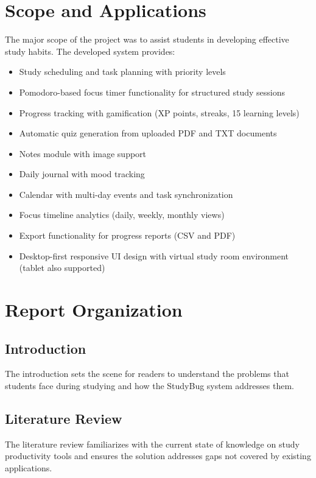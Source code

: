         \section{Scope and Applications}
        The major scope of the project was to assist students in developing effective study habits. The developed system provides:
        \begin{itemize}
            \item Study scheduling and task planning with priority levels
            \item Pomodoro-based focus timer functionality for structured study sessions
            \item Progress tracking with gamification (XP points, streaks, 15 learning levels)
            \item Automatic quiz generation from uploaded PDF and TXT documents
            \item Notes module with image support
            \item Daily journal with mood tracking
            \item Calendar with multi-day events and task synchronization
            \item Focus timeline analytics (daily, weekly, monthly views)
            \item Export functionality for progress reports (CSV and PDF)
            \item Desktop-first responsive UI design with virtual study room environment (tablet also supported)
        \end{itemize}

        \section{Report Organization}
            \subsection{Introduction}
                The introduction sets the scene for readers to understand the problems that students face during studying and how the StudyBug system addresses them.
            \subsection{Literature Review}
                The literature review familiarizes with the current state of knowledge on study productivity tools and ensures the solution addresses gaps not covered by existing applications.
